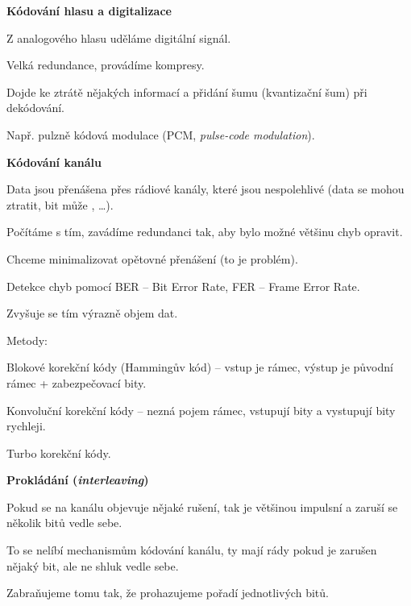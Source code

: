 \begin{compactenum}
    \item \textbf{Kódování hlasu a digitalizace} \begin{compactitem}
        \item Z analogového hlasu uděláme digitální signál.
        \item Velká redundance, provádíme kompresy.
        \item Dojde ke ztrátě nějakých informací a přidání šumu (kvantizační šum) při dekódování.
        \item Např. pulzně kódová modulace (PCM, \textit{pulse-code modulation}).
    \end{compactitem}

    \item \textbf{Kódování kanálu} \begin{compactitem}
        \item Data jsou přenášena přes rádiové kanály, které jsou nespolehlivé (data se mohou ztratit, bit může , \dots).
        \item Počítáme s tím, zavádíme redundanci tak, aby bylo možné většinu chyb opravit. \begin{compactitem}
            \item Chceme minimalizovat opětovné přenášení (to je problém).
            \item Detekce chyb pomocí BER -- Bit Error Rate, FER -- Frame Error Rate.
        \end{compactitem}
        \item Zvyšuje se tím výrazně objem dat.
        \item Metody: \begin{compactitem}
            \item Blokové korekční kódy (Hammingův kód) -- vstup je rámec, výstup je původní rámec + zabezpečovací bity.
            \item Konvoluční korekční kódy -- nezná pojem rámec, vstupují bity a vystupují bity rychleji.
            \item Turbo korekční kódy.
        \end{compactitem}
    \end{compactitem}

    \item \textbf{Prokládání (\textit{interleaving})} \begin{compactitem}
        \item Pokud se na kanálu objevuje nějaké rušení, tak je většinou impulsní a zaruší se několik bitů vedle sebe.
        \item To se nelíbí mechanismům kódování kanálu, ty mají rády pokud je zarušen  nějaký bit, ale ne shluk vedle sebe.
        \item Zabraňujeme tomu tak, že prohazujeme pořadí jednotlivých bitů.
    \end{compactitem}


\end{compactenum}
